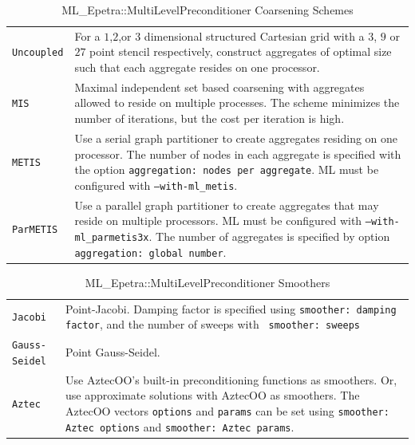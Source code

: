 \begin{table}
\begin{center}
\begin{tabular}{ | p{5cm} | p{10cm} | }
\hline
\verb!Uncoupled! & For a $1$,$2$,or $3$ dimensional structured Cartesian grid 
                   with a $3$, $9$ or $27$ point stencil respectively,
                   construct aggregates of optimal size such that
                   each aggregate resides on one processor.\\
\verb!MIS! & Maximal independent set based coarsening with aggregates
             allowed to reside on multiple processes. 
             The scheme minimizes the number of iterations,
             but the cost per iteration is high.  \\
\verb!METIS! & Use a serial graph partitioner to create
               aggregates residing on one processor. 
               The number of nodes in each aggregate
               is specified with the option {\tt aggregation: nodes per aggregate}.
               ML must be configured with {\tt --with-ml\_metis}. \\
\verb!ParMETIS! & Use a parallel graph partitioner to create aggregates that
                  may reside on multiple processors.  
                  ML must be configured with {\tt --with-ml\_parmetis3x}. 
                  The number of aggregates is
                  specified by option {\tt aggregation: global number}. \\
\hline
\end{tabular}
\caption{ML\_Epetra::MultiLevelPreconditioner Coarsening Schemes}
\label{tab:ml:aggr}
\end{center}
\end{table}

\begin{table}
\begin{center}
\begin{tabular}{ | p{5cm} | p{10cm} | }
\hline
\verb!Jacobi! & Point-Jacobi. Damping factor is specified using
{\tt smoother: damping factor}, and the number of sweeps with {\tt
  smoother: sweeps} \\ 
\verb!Gauss-Seidel! & Point Gauss-Seidel. \\
\verb!Aztec! & Use AztecOO's built-in preconditioning functions as
smoothers. Or, use approximate solutions with AztecOO as smoothers. 
The AztecOO vectors \verb!options! and {\tt params} can be set using
{\tt smoother: Aztec options} and {\tt smoother: Aztec params}. \\
\hline
\end{tabular}
\caption{ML\_Epetra::MultiLevelPreconditioner Smoothers} 
\label{tab:ml:smoother}
\end{center}
\end{table}

